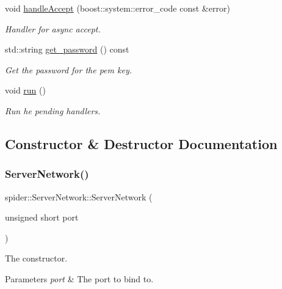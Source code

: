 \begin{DoxyCompactItemize}
void \hyperlink{classspider_1_1_server_network_a94a88f381fb5ab7c6f779615d14ebbb9}{handle\+Accept} (boost\+::system\+::error\+\_\+code const \&error)
\begin{DoxyCompactList}\small\item\em Handler for async accept. \end{DoxyCompactList}\item 
std\+::string \hyperlink{classspider_1_1_server_network_af177fc329a2be83ada20a9988025a7cd}{get\+\_\+password} () const
\begin{DoxyCompactList}\small\item\em Get the password for the pem key. \end{DoxyCompactList}\item 
\mbox{\label{classspider_1_1_server_network_acccd166e6a5ce90636a491a60cc97abf}} 
void \hyperlink{classspider_1_1_server_network_acccd166e6a5ce90636a491a60cc97abf}{run} ()
\begin{DoxyCompactList}\small\item\em Run he pending handlers. \end{DoxyCompactList}\end{DoxyCompactItemize}


\subsection{Constructor \& Destructor Documentation}
\mbox{\label{classspider_1_1_server_network_af115121ee56f135db6ae6a2f9c24e6fc}} 
\subsubsection{\texorpdfstring{Server\+Network()}{ServerNetwork()}}
{\footnotesize\ttfamily spider\+::\+Server\+Network\+::\+Server\+Network (\begin{DoxyParamCaption}\item[{unsigned short}]{port }\end{DoxyParamCaption})}



The constructor. 


\begin{DoxyParams}{Parameters}
{\em port} & The port to bind to. \\
\hline
\end{DoxyParams}


